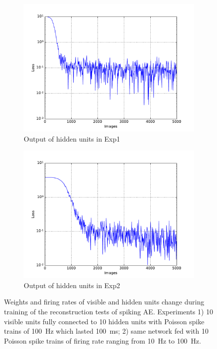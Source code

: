 \begin{figure}
\begin{subfigure}[t]{0.4\textwidth}
		\includegraphics[width=\textwidth]{pics_sdlm/00_exp_SAE_Orig/exp1_mse_nons.pdf}
		\caption{Output of hidden units in Exp1}
	\end{subfigure}
	\begin{subfigure}[t]{0.4\textwidth}
		\includegraphics[width=\textwidth]{pics_sdlm/00_exp_SAE_Orig/exp2_mse_nons.pdf}
		\caption{Output of hidden units in Exp2}
	\end{subfigure}
	\caption{Weights and firing rates of visible and hidden units change during training of the reconstruction tests of spiking AE. 
		Experiments 1) 10 visible units fully connected to 10 hidden units with Poisson spike trains of 100~Hz which lasted 100~ms; 2) same network fed with 10 Poisson spike trains of firing rate ranging from 10~Hz to 100~Hz.}
\end{figure}

